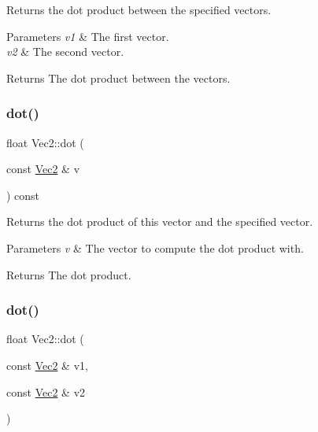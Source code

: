 Returns the dot product between the specified vectors.


\begin{DoxyParams}{Parameters}
{\em v1} & The first vector. \\
\hline
{\em v2} & The second vector.\\
\hline
\end{DoxyParams}
\begin{DoxyReturn}{Returns}
The dot product between the vectors. 
\end{DoxyReturn}
\mbox{\label{classVec2_a0077f35f41e7499847b5332a0ce42438}} 
\subsubsection{\texorpdfstring{dot()}{dot()}\hspace{0.1cm}{\footnotesize\ttfamily [3/4]}}
{\footnotesize\ttfamily float Vec2\+::dot (\begin{DoxyParamCaption}\item[{const \hyperlink{classVec2}{Vec2} \&}]{v }\end{DoxyParamCaption}) const\hspace{0.3cm}{\ttfamily [inline]}}

Returns the dot product of this vector and the specified vector.


\begin{DoxyParams}{Parameters}
{\em v} & The vector to compute the dot product with.\\
\hline
\end{DoxyParams}
\begin{DoxyReturn}{Returns}
The dot product. 
\end{DoxyReturn}
\mbox{\label{classVec2_a399b823d9d25949b107850080a5f8653}} 
\subsubsection{\texorpdfstring{dot()}{dot()}\hspace{0.1cm}{\footnotesize\ttfamily [4/4]}}
{\footnotesize\ttfamily float Vec2\+::dot (\begin{DoxyParamCaption}\item[{const \hyperlink{classVec2}{Vec2} \&}]{v1,  }\item[{const \hyperlink{classVec2}{Vec2} \&}]{v2 }\end{DoxyParamCaption})\hspace{0.3cm}{\ttfamily [static]}}

